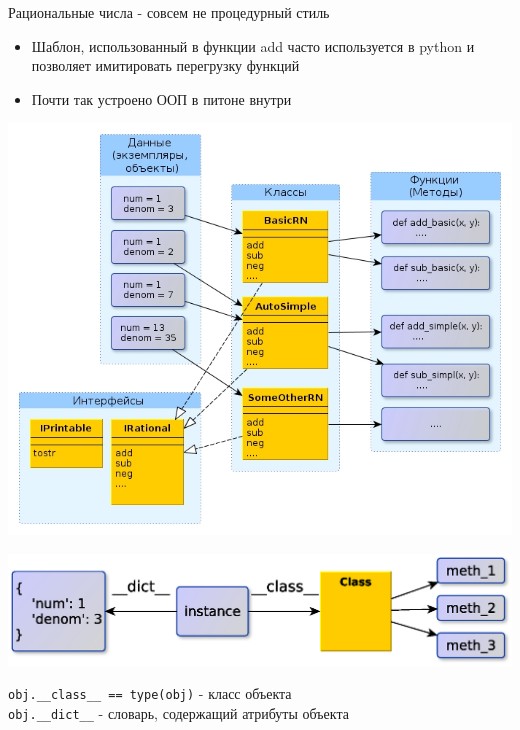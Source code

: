 \documentclass{article}
\begin{document}
\begin{center} Рациональные числа - совсем не процедурный стиль \end{center}
\begin{itemize}
    \item Шаблон, использованный в функции add часто используется в 
          python и позволяет имитировать перегрузку функций
    \item Почти так устроено ООП в питоне внутри
\end{itemize}
\newpage

\begin{center} \includegraphics[scale=0.8]{images/oop_style.jpg} \end{center} 
\newpage

\begin{center} \includegraphics[scale=0.8]{images/python_instance.eps} \end{center} 
\lstinline!obj.__class__ == type(obj)! - класс объекта \\
\lstinline!obj.__dict__! - словарь, содержащий атрибуты объекта
\newpage
\end{document}
